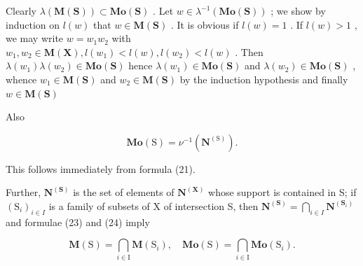 Clearly \(\lambda (\mathbf{M}(\mathbf{S}))\subset \mathbf{Mo}(\mathbf{S})\) . Let \(w\in \lambda^{-1}(\mathbf{Mo}(\mathbf{S}))\) ; we show by induction on \(l(w)\) that \(w\in \mathbf{M}(\mathbf{S})\) . It is obvious if \(l(w) = 1\) . If \(l(w) > 1\) , we may write \(w = w_{1}w_{2}\) with \(w_{1},w_{2}\in \mathbf{M}(\mathbf{X}), l(w_{1}) <   l(w),l(w_{2}) <   l(w)\) . Then \(\lambda (w_1)\lambda (w_2)\in \mathbf{Mo}(\mathbf{S})\) hence \(\lambda (w_1)\in \mathbf{Mo}(\mathbf{S})\) and \(\lambda (w_2)\in \mathbf{Mo}(\mathbf{S})\) , whence \(w_{1}\in \mathbf{M}(\mathbf{S})\) and \(w_{2}\in \mathbf{M}(\mathbf{S})\) by the induction hypothesis and finally \(w\in \mathbf{M}(\mathbf{S})\)

Also

\[
\mathbf {M o} (\mathrm{S}) = \nu^ {- 1} (\mathbf {N} ^ {(\mathrm{S})}).\tag{24}
\]

This follows immediately from formula (21).

Further, \(\mathbf{N}^{(\mathbf{S})}\) is the set of elements of \(\mathbf{N}^{(\mathbf{X})}\) whose support is contained in S; if \((\mathrm{S}_i)_{i\in I}\) is a family of subsets of X of intersection S, then \(\mathbf{N}^{(\mathbf{S})} = \bigcap_{i\in I}\mathbf{N}^{(\mathbf{S}_i)}\) and formulae (23) and (24) imply

\[
\mathbf {M} (\mathrm{S}) = \bigcap_ {i \in \mathrm{I}} \mathbf {M} (\mathrm{S} _ {i}), \quad \mathbf {M o} (\mathrm{S}) = \bigcap_ {i \in \mathrm{I}} \mathbf {M o} (\mathrm{S} _ {i}).\tag{25}
\]

